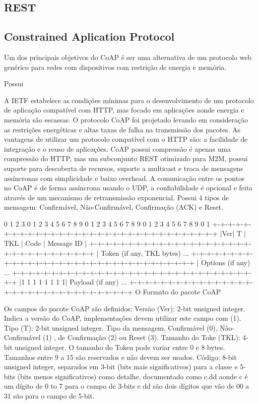 \subsection{REST}

\subsection{Constrained Aplication Protocol}

Um dos principais objetivos do CoAP \'e ser uma alternativa de um protocolo web gen\'erico para redes com dispositivos com restri\c{c}\~ao de energia e mem\'oria.

Possui 

A IETF estabelece as condi\c{c}\~oes m\'inimas para o desenvolvimento de um protocolo de aplica\c{c}\~ao compat\'ivel com HTTP, mas focado em aplica\c{c}\~oes aonde energia e mem\'oria s\~ao escassas. O protocolo CoAP foi projetado levando em considera\c{c}\~ao as restri\c{c}\~oes energ\'eticas e altas taxas de falha na transmiss\~ao dos pacotes. As vantagens de utilizar um protocolo compat\'ivel com o HTTP s\~ao: a facilidade de integra\c{c}\~ao e o reuso de aplica\c{c}\~oes. CoAP possui compress\~ao \'e apenas uma compress\~ao do HTTP, mas um subconjunto REST otimizado para M2M, possui suporte para descoberta de recursos, suporte a multicast e troca de mensagens ass\'incronas com simplicidade e baixo overhead. A comunica\c{c}\~ao entre os pontos no CoAP \'e de forma ass\'incrona usando o UDP, a confiabilidade \'e opcional e feita atrav\'es de um mecanismo de retransmiss\~ao exponencial. Possui 4 tipos de mensagem: Confirm\'avel, N\~ao-Confirm\'avel, Confirma\c{c}\~ao (ACK) e Reset.


     0                   1                   2                   3
    0 1 2 3 4 5 6 7 8 9 0 1 2 3 4 5 6 7 8 9 0 1 2 3 4 5 6 7 8 9 0 1
   +-+-+-+-+-+-+-+-+-+-+-+-+-+-+-+-+-+-+-+-+-+-+-+-+-+-+-+-+-+-+-+-+
   |Ver| T |  TKL  |      Code     |          Message ID           |
   +-+-+-+-+-+-+-+-+-+-+-+-+-+-+-+-+-+-+-+-+-+-+-+-+-+-+-+-+-+-+-+-+
   |   Token (if any, TKL bytes) ...
   +-+-+-+-+-+-+-+-+-+-+-+-+-+-+-+-+-+-+-+-+-+-+-+-+-+-+-+-+-+-+-+-+
   |   Options (if any) ...
   +-+-+-+-+-+-+-+-+-+-+-+-+-+-+-+-+-+-+-+-+-+-+-+-+-+-+-+-+-+-+-+-+
   |1 1 1 1 1 1 1 1|    Payload (if any) ...
   +-+-+-+-+-+-+-+-+-+-+-+-+-+-+-+-+-+-+-+-+-+-+-+-+-+-+-+-+-+-+-+-+
   O Formato do pacote CoAP  \cite{draft-ietf-core-coap-18}


Os campos do pacote CoAP s\~ao definidos:
   Vers\~ao (Ver):  2-bit unsigned integer.  Indica a vers\~ao do CoAP, implementa\c{c}\~oes devem utilizar este campo com (1).
   Tipo (T):  2-bit unsigned integer. Tipo da mensagem, Confirm\'avel (0), N\~ao-Confirm\'avel (1) , de Confirma\c{c}\~ao (2) ou Reset (3).
   Tamanho do Toke (TKL):  4-bit unsigned integer. O tamanho do Token pode variar entre 0 e 8 bytes. Tamanhos entre 9 a 15 s\~ao reservados e n\~ao devem ser usados.
   C\'odigo:  8-bit unsigned integer, separados em 3-bit (bits mais significativos) para a classe e 5-bits (bits menos significativos) como detalhe, documentado como c.dd aonde c \'e um d\'igito de 0 to 7 para o campo de 3-bits e dd s\~ao dois d\'igitos que v\~ao de 00 a 31 s\~ao para o campo de 5-bit.
   
